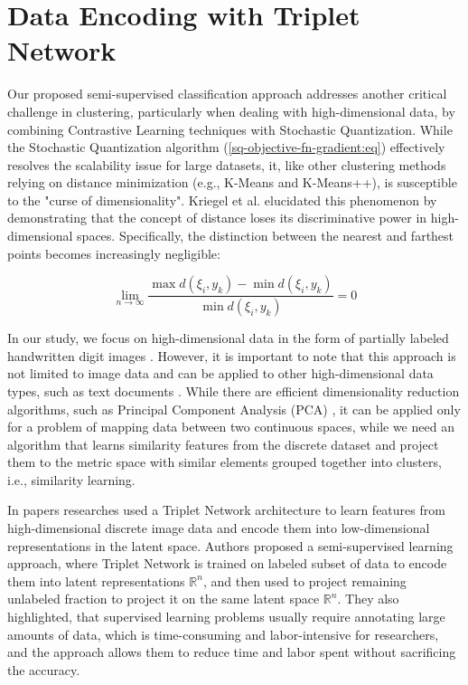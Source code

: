 \section{Data Encoding with Triplet Network}

Our proposed semi-supervised classification approach addresses another critical challenge in clustering, particularly when dealing with high-dimensional data, by combining Contrastive Learning techniques \cite{Hoffer_2015,Khosla_2020} with Stochastic Quantization. While the Stochastic Quantization algorithm (\ref{sq-objective-fn-gradient:eq}) effectively resolves the scalability issue for large datasets, it, like other clustering methods relying on distance minimization (e.g., K-Means and K-Means++), is susceptible to the "curse of dimensionality". Kriegel et al. \cite{Kriegel_Kröger_Zimek_2009} elucidated this phenomenon by demonstrating that the concept of distance loses its discriminative power in high-dimensional spaces. Specifically, the distinction between the nearest and farthest points becomes increasingly negligible:

\begin{equation}
    \label{dimensions-precision-ratio:eq}
    \lim_{n \to \infty} \frac{\max d(\xi_i, y_k) - \min d(\xi_i, y_k)}{\min d(\xi_i, y_k)} = 0
\end{equation}

In our study, we focus on high-dimensional data in the form of partially labeled handwritten digit images \cite{lecun2010mnist}. However, it is important to note that this approach is not limited to image data and can be applied to other high-dimensional data types, such as text documents \cite{Radomirovic_2023,Widodo_2011}. While there are efficient dimensionality reduction algorithms, such as Principal Component Analysis (PCA) \cite{Abdi_Williams_2010,Deisenroth_Faisal_Ong_2020}, it can be applied only for a problem of mapping data between two continuous spaces, while we need an algorithm that learns similarity features from the discrete dataset and project them to the metric space with similar elements grouped together into clusters, i.e., similarity learning.

In papers \cite{MURASAKI_ANDO_SHIMAMURA_2022,Turpault_Serizel_Vincent_2019} researches used a Triplet Network architecture to learn features from high-dimensional discrete image data and encode them into low-dimensional representations in the latent space. Authors proposed a semi-supervised learning approach, where Triplet Network is trained on labeled subset of data to encode them into latent representations $ \mathbb{R}^n $, and then used to project remaining unlabeled fraction to project it on the same latent space $ \mathbb{R}^n $. They also highlighted, that supervised learning problems usually require annotating large amounts of data, which is time-consuming and labor-intensive for researchers, and the approach allows them to reduce time and labor spent without sacrificing the accuracy. 

